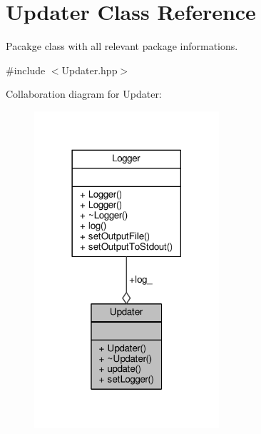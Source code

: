 \hypertarget{classUpdater}{\section{Updater Class Reference}
\label{classUpdater}
}


Pacakge class with all relevant package informations.  




{\ttfamily \#include $<$Updater.\-hpp$>$}



Collaboration diagram for Updater\-:
\nopagebreak
\begin{figure}[H]
\begin{center}
\leavevmode
\includegraphics[width=194pt]{classUpdater__coll__graph}
\end{center}
\end{figure}
